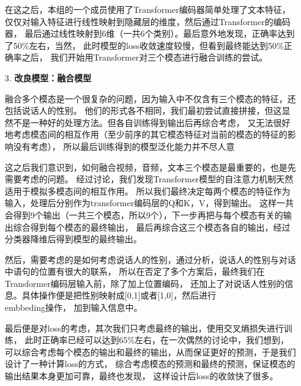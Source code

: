 \documentclass[11pt]{article}
\begin{document}
\begin{enumerate}
                在这之后，本组的一个成员使用了Transformer编码器简单处理了文本特征，
                仅仅对输入特征进行线性映射到隐藏层的维度，然后通过Transformer的编码器，
                最后通过线性映射到6维（一共6个类别）。最后意外地发现，正确率达到了50\%左右，当然，
                此时模型的loss收敛速度较慢，但看到最终能达到50\%正确率之后，
                我们开始用Transformer对三个模态进行融合训练的尝试。
                
                \item [3. ]\textbf{改良模型：融合模型}\par
                
                融合多个模态是一个很复杂的问题，因为输入中不仅含有三个模态的特征，还包括说话人的性别。
                他们的形式各不相同，我们最初尝试直接拼接，但这显然不是一种好的处理方法。但各自训练得到输出后再综合考虑，
                又无法很好地考虑模态间的相互作用（至少前序的其它模态特征对当前的模态的特征的影响没有考虑），
                所以最后训练得到的模型泛化能力并不尽人意

                这之后我们意识到，如何融合视频，音频，文本三个模态是最重要的，也是先需要考虑的问题。
                经过讨论，我们发现Transformer模型的自注意力机制天然适用于模拟多模态间的相互作用。
                所以我们最终决定每两个模态的特征作为输入，处理后分别作为transformer编码层的Q和K，V，得到输出。
                这样一共会得到9个输出（一共三个模态，所以9个），下一步再把与每个模态有关的输出综合得到每个模态的最终输出，
                最后再综合这三个模态各自的输出，经过分类器降维后得到模型的最终输出。
                
                然后，需要考虑的是如何考虑说话人的性别，通过分析，说话人的性别与对话中语句的位置有很大的联系，
                所以在否定了多个方案后，最终我们在Transformer编码层输入前，除了加上位置编码，
                还加上了对说话人性别的信息。具体操作便是把性别映射成[0,1]或者[1,0]，然后进行\\embbeding操作，
                加到输入信息中。
                
                最后便是对loss的考虑，其次我们只考虑最终的输出，使用交叉熵损失进行训练，
                此时正确率已经可以达到65\%左右，在一次偶然的讨论中，我们想到，
                可以综合考虑每个模态的输出和最终的输出，从而保证更好的预测，于是我们设计了一种计算loss的方式，
                综合考虑模态的预测和最终的预测，保证模态的输出结果本身更加可靠，最终也发现，
                这样设计后loss的收敛快了很多。

            \end{enumerate}
\end{document}
